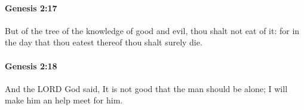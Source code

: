 		\paragraph{Genesis 2:17} %
			\label{GENESIS-2-17}

			But of the tree of the knowledge of good and evil, thou shalt not eat of it: for in the day that thou eatest thereof thou shalt surely die.


		\paragraph{Genesis 2:18} %
			\label{GENESIS-2-18}

			And the LORD God said, It is not good that the man should be alone; I will make him an help meet for him.



